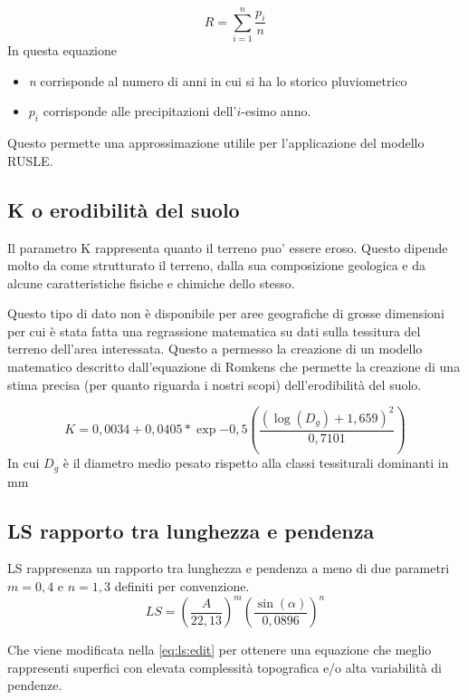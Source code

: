 \begin{equation}\label{eq:r}
	R = \sum_{i=1}^{n} \frac{p_i}{n}
\end{equation}
In questa equazione
\begin{itemize}
	\item \textit{n} corrisponde al numero di anni in cui si ha lo storico pluviometrico
	\item \textit{$p_i$} corrisponde alle precipitazioni dell'$i$-esimo anno.
\end{itemize}

Questo permette una approssimazione utilile per l'applicazione del modello RUSLE.

\subsection{K o erodibilità del suolo}
Il parametro K rappresenta quanto il terreno puo' essere eroso. Questo dipende molto da come  strutturato il terreno, dalla sua composizione geologica e da alcune caratteristiche fisiche e chimiche dello stesso.

Questo tipo di dato non è disponibile per aree geografiche di grosse dimensioni per cui è stata fatta una regrassione matematica su dati sulla tessitura del terreno dell'area interessata. Questo a permesso la creazione di un modello matematico descritto dall'equazione di Romkens che permette la creazione di una stima precisa (per quanto riguarda i nostri scopi) dell'erodibilità del suolo.

\begin{equation}\label{eq:k}
	K=0,0034 + 0,0405 * \exp{-0,5\left( \dfrac{(\log(D_g)+1,659)^2}{0,7101} \right) }
\end{equation}
In cui $D_g$ è il diametro medio pesato rispetto alla classi tessiturali dominanti in mm


\subsection{LS rapporto tra lunghezza e pendenza}
LS rappresenza un rapporto tra lunghezza e pendenza a meno di due parametri $m=0,4$ e $n=1,3$ definiti per convenzione.
\begin{equation}\label{eq:ls}
	LS = \left(  \dfrac{A}{22,13} \right)^m
	\left(  \dfrac{\sin(\alpha)}{0,0896} \right)^n
\end{equation}

Che viene modificata nella \eqref{eq:ls:edit} per ottenere una equazione che meglio rappresenti superfici con elevata complessità topografica e/o alta variabilità di pendenze.

